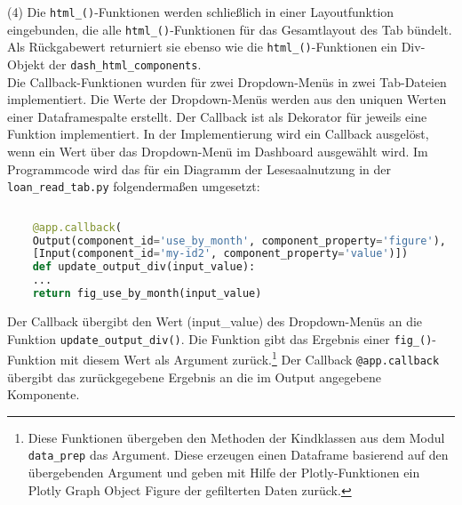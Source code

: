    (4) Die \texttt{html\_()}-Funktionen werden schließlich in einer Layoutfunktion eingebunden, die alle \texttt{html\_()}-Funktionen
    für das Gesamtlayout des Tab bündelt. Als Rückgabewert returniert sie ebenso wie die \texttt{html\_()}-Funktionen ein Div-Objekt der \texttt{dash\_html\_components}.\\



    Die Callback-Funktionen wurden für zwei Dropdown-Menüs in zwei Tab-Dateien implementiert.
    Die Werte der Dropdown-Menüs werden aus den uniquen Werten einer Dataframespalte erstellt.
    Der Callback ist als Dekorator für jeweils eine Funktion implementiert. 
    In der Implementierung wird ein Callback ausgelöst, wenn ein Wert über das Dropdown-Menü im Dashboard ausgewählt wird.
    Im Programmcode wird das für ein Diagramm der Lesesaalnutzung in der \texttt{loan\_read\_tab.py} folgendermaßen umgesetzt:

    \begin{lstlisting}[language=Python, caption=Teilsystem 3 Darstellung - update\_output\_div()]        
    
    @app.callback(
    Output(component_id='use_by_month', component_property='figure'),
    [Input(component_id='my-id2', component_property='value')])
    def update_output_div(input_value):
    ...
    return fig_use_by_month(input_value)
    \end{lstlisting}


 
    Der Callback übergibt den Wert (input\_value) des Dropdown-Menüs an die Funktion \texttt{update\_output\_div()}. 
    Die Funktion gibt das Ergebnis einer \texttt{fig\_()}-Funktion mit diesem Wert als Argument zurück.\footnote{ Diese Funktionen übergeben den Methoden der Kindklassen aus dem Modul \texttt{data\_prep} das Argument. 
    Diese erzeugen einen Dataframe basierend auf den übergebenden Argument und geben mit Hilfe der Plotly-Funktionen ein Plotly Graph Object Figure der gefilterten Daten zurück.}
    Der Callback \texttt{@app.callback} übergibt das zurückgegebene Ergebnis an die im Output angegebene Komponente.
    
